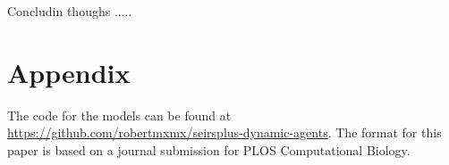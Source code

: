 \documentclass{article}
\begin{document}
Concludin thoughs .....

\newpage

{}


\newpage
\appendix

\section{Appendix}
The code for the models can be found at \url{https://github.com/robertmxmx/seirsplus-dynamic-agents}.
The format for this paper is based on a journal submission for PLOS Computational Biology.
\end{document}
